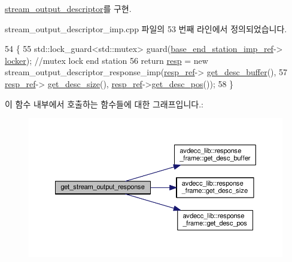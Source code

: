 \hyperlink{classavdecc__lib_1_1stream__output__descriptor_af92b70610c451a7f1eefcb71b3d97eb8}{stream\+\_\+output\+\_\+descriptor}를 구현.



stream\+\_\+output\+\_\+descriptor\+\_\+imp.\+cpp 파일의 53 번째 라인에서 정의되었습니다.


\begin{DoxyCode}
54 \{
55     std::lock\_guard<std::mutex> guard(\hyperlink{classavdecc__lib_1_1descriptor__base__imp_a550c969411f5f3b69f55cc139763d224}{base\_end\_station\_imp\_ref}->
      \hyperlink{classavdecc__lib_1_1end__station__imp_a2207f93fef130266b292686bf96ef8d3}{locker}); \textcolor{comment}{//mutex lock end station}
56     \textcolor{keywordflow}{return} \hyperlink{classavdecc__lib_1_1stream__output__descriptor__imp_a48592b631f05337146bcc262acfa95c9}{resp} = \textcolor{keyword}{new} stream\_output\_descriptor\_response\_imp(\hyperlink{classavdecc__lib_1_1descriptor__base__imp_a2642e3a7c10d38553e7ff4a55e875346}{resp\_ref}->
      \hyperlink{classavdecc__lib_1_1response__frame_a87db6e7ad7e047437cf9c9eaab873626}{get\_desc\_buffer}(),
57                                                             \hyperlink{classavdecc__lib_1_1descriptor__base__imp_a2642e3a7c10d38553e7ff4a55e875346}{resp\_ref}->
      \hyperlink{classavdecc__lib_1_1response__frame_a5302ae13c549f066040ce0e7c7d11ae6}{get\_desc\_size}(), \hyperlink{classavdecc__lib_1_1descriptor__base__imp_a2642e3a7c10d38553e7ff4a55e875346}{resp\_ref}->\hyperlink{classavdecc__lib_1_1response__frame_a6e6f6cc3d681d41c6de6139ca9cb79d9}{get\_desc\_pos}());
58 \}
\end{DoxyCode}


이 함수 내부에서 호출하는 함수들에 대한 그래프입니다.\+:
\nopagebreak
\begin{figure}[H]
\begin{center}
\leavevmode
\includegraphics[width=350pt]{classavdecc__lib_1_1stream__output__descriptor__imp_a52997a75713818c5a0f66d43d73abb67_cgraph}
\end{center}
\end{figure}


